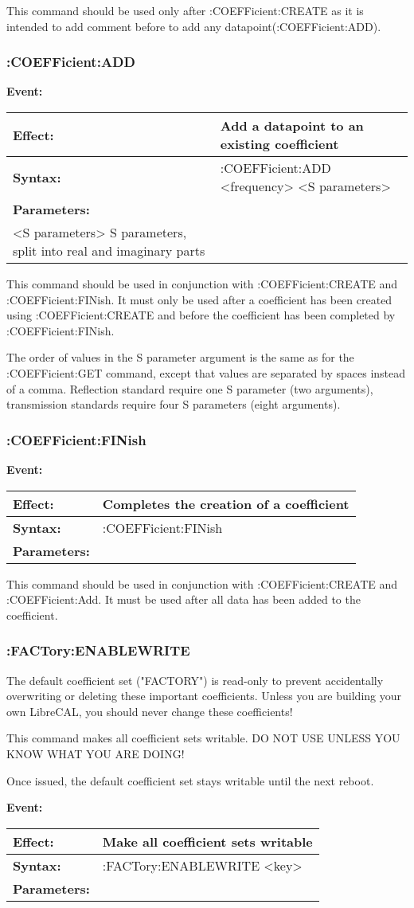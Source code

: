 \documentclass[a4paper,11pt]{article}
\newcommand{\dev}{LibreCAL}
\newcommand{\event}[3]{
\noindent\textbf{Event:}
\begin{longtable}{p{.15\textwidth} | p{.80\textwidth} } 
\hline
\textbf{Effect:} & #1 \\ \hline
\textbf{Syntax:} & #2 \\ \hline 
\textbf{Parameters:} & \makecell[Xl]{#3} \\ \hline
\end{longtable}
}
\begin{document}
This command should be used only after :COEFFicient:CREATE as it is intended to add comment before to add any datapoint(:COEFFicient:ADD).
\subsubsection{:COEFFicient:ADD}
\event{Add a datapoint to an existing coefficient}{:COEFFicient:ADD <frequency> <S parameters>}{<frequency> Frequency of the datapoint, in GHz\\
<S parameters> S parameters, split into real and imaginary parts}
This command should be used in conjunction with :COEFFicient:CREATE and :COEFFicient:FINish. It must only be used after a coefficient has been created using :COEFFicient:CREATE and before the coefficient has been completed by :COEFFicient:FINish.

The order of values in the S parameter argument is the same as for the :COEFFicient:GET command, except that values are separated by spaces instead of a comma. Reflection standard require one S parameter (two arguments), transmission standards require four S parameters (eight arguments).
\subsubsection{:COEFFicient:FINish}
\event{Completes the creation of a coefficient}{:COEFFicient:FINish}{None}
This command should be used in conjunction with :COEFFicient:CREATE and :COEFFicient:Add. It must be used after all data has been added to the coefficient.

\subsubsection{:FACTory:ENABLEWRITE}
The default coefficient set ("FACTORY") is read-only to prevent accidentally overwriting or deleting these important coefficients. Unless you are building your own \dev{}, you should never change these coefficients!

This command makes all coefficient sets writable. DO NOT USE UNLESS YOU KNOW WHAT YOU ARE DOING!

Once issued, the default coefficient set stays writable until the next reboot.

\event{Make all coefficient sets writable}{:FACTory:ENABLEWRITE <key>}{<key> Prevents accidental usage, set to "I\_AM\_SURE"}
\end{document}
